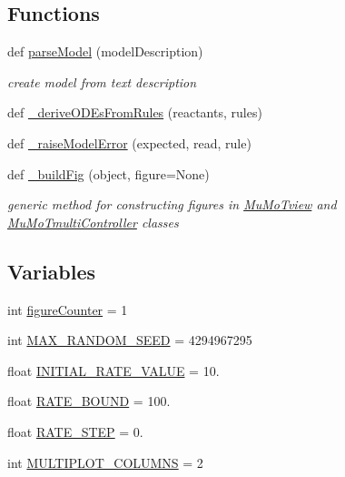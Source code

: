 \subsection*{Functions}
\begin{DoxyCompactItemize}
\item 
def \hyperlink{namespace_mu_mo_t_a563aad4a460dbcc0705cf99bb6f6dd5d}{parse\+Model} (model\+Description)
\begin{DoxyCompactList}\small\item\em create model from text description \end{DoxyCompactList}\item 
def \hyperlink{namespace_mu_mo_t_a276566fb102dd4e4bf32a9ba4fb8a09b}{\+\_\+derive\+O\+D\+Es\+From\+Rules} (reactants, rules)
\item 
def \hyperlink{namespace_mu_mo_t_a07dd350ff74bc1abafd7f44f972089a2}{\+\_\+raise\+Model\+Error} (expected, read, rule)
\item 
def \hyperlink{namespace_mu_mo_t_a4cf5ca1427b0999c933587bfaa89936d}{\+\_\+build\+Fig} (object, figure=None)
\begin{DoxyCompactList}\small\item\em generic method for constructing figures in \hyperlink{class_mu_mo_t_1_1_mu_mo_tview}{Mu\+Mo\+Tview} and \hyperlink{class_mu_mo_t_1_1_mu_mo_tmulti_controller}{Mu\+Mo\+Tmulti\+Controller} classes \end{DoxyCompactList}\end{DoxyCompactItemize}
\subsection*{Variables}
\begin{DoxyCompactItemize}
\item 
int \hyperlink{namespace_mu_mo_t_a4543afee285a2aa1cd5c8c9ca14fe77f}{figure\+Counter} = 1
\item 
int \hyperlink{namespace_mu_mo_t_ae8957aab30c8ae3e6065cd19d166ef22}{M\+A\+X\+\_\+\+R\+A\+N\+D\+O\+M\+\_\+\+S\+E\+ED} = 4294967295
\item 
float \hyperlink{namespace_mu_mo_t_aa168c4a595cabfd7f2af95bcc8c8636f}{I\+N\+I\+T\+I\+A\+L\+\_\+\+R\+A\+T\+E\+\_\+\+V\+A\+L\+UE} = 10.
\item 
float \hyperlink{namespace_mu_mo_t_ad02e9bfc63846779b7b8c5aff0688879}{R\+A\+T\+E\+\_\+\+B\+O\+U\+ND} = 100.
\item 
float \hyperlink{namespace_mu_mo_t_a62b44f6ef63c58313e64af86a7219285}{R\+A\+T\+E\+\_\+\+S\+T\+EP} = 0.
\item 
int \hyperlink{namespace_mu_mo_t_a3911ed84a3973ff4c37bb3bd7d39f22d}{M\+U\+L\+T\+I\+P\+L\+O\+T\+\_\+\+C\+O\+L\+U\+M\+NS} = 2
\end{DoxyCompactItemize}


